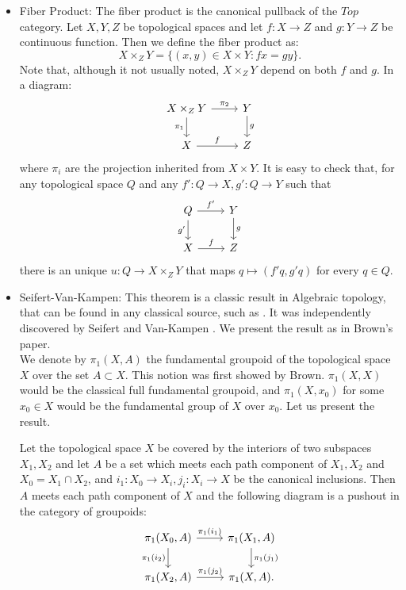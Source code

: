 \begin{example}
  \begin{itemize}\label{fiber-product}
  \item Fiber Product: The fiber product is the canonical pullback of the $Top$ category. Let $X,Y,Z$ be topological spaces and let $f:X\to Z$ and $g: Y\to Z$ be continuous function. Then we define the fiber product as:
    $$X\times_ZY = \{(x,y) \in X\times Y: fx=gy\}.$$ Note that, although it not usually noted, $X\times_Z Y$ depend on both $f$ and $g$. In a diagram:
    \[
      \begin{tikzcd}
        X\times_Z Y\arrow{r}{\pi_2}\arrow[swap]{d}{\pi_1} & Y\arrow{d}{g}\\
        X\arrow{r}{f} & Z
      \end{tikzcd}
    \]
    where $\pi_i$ are the projection inherited from $X\times Y$. It is easy to check that, for any topological space $Q$ and any $f':Q\to X, g': Q \to Y$ such that
    \[
      \begin{tikzcd}
        Q\arrow{r}{f'}\arrow[swap]{d}{g'} & Y\arrow{d}{g}\\
        X\arrow{r}{f} & Z
      \end{tikzcd}
    \]
    there is an unique $u:Q\to X\times_Z Y$ that maps $q\mapsto (f'q,g'q)$ for every $q\in Q$.\\
  \item Seifert-Van-Kampen: This theorem is a classic result in Algebraic topology, that can be found in any classical source, such as \cite{munkres2000topology}. It was independently discovered by Seifert \cite{seifert1931konstruktion} and Van-Kampen \cite{van1933connection}.  We present the result as in  Brown's paper\cite{brown1967groupoids}.\\

    We denote by $\pi_1(X,A)$ the fundamental groupoid of the topological space $X$ over the set $A\subset X$. This notion was first showed by Brown. $\pi_1(X,X)$ would be the classical full fundamental groupoid, and $\pi_1(X,x_0)$ for some $x_0\in X$ would be the fundamental group of $X$ over $x_0$. Let us present the result.
    \begin{theorem}
      Let the topological space $X$  be covered by the interiors of two subspaces $X_1,X_2$ and let $A$
      be a set which meets each path component of $X_1, X_2$ and $X_0=X_1\cap X_2$, and $i_1: X_0 \to X_i,j_i: X_i \to X $ be the canonical inclusions. Then $A$  meets each path component of $X$  and the following diagram is a pushout in the category of groupoids:
      \[
        \begin{tikzcd}
          \pi_1(X_0,A)\arrow{r}{\pi_1(i_1)}\arrow[swap]{d}{\pi_1(i_2)} & \pi_1(X_1,A)\arrow{d}{\pi_1(j_1)}\\
          \pi_1(X_2,A)\arrow{r}{\pi_1(j_2)} & \pi_1(X,A).\\
        \end{tikzcd}
      \]

    \end{theorem}


  \end{itemize}
\end{example}

